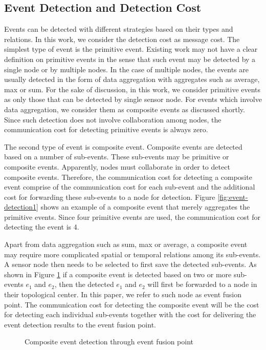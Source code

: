 \subsection{Event Detection and Detection Cost}
Events can be detected with different strategies based on their types and relations. In this work, we consider the detection cost as message cost. The simplest type of event is the primitive event. Existing work may not have a clear definition on primitive events in the sense that such event may be detected by a single node or by multiple nodes. In the case of multiple nodes, the events are usually detected in the form of data aggregation with aggregates such as average, max or sum. For the sake of discussion, in this work, we consider primitive events as only those that can be detected by single sensor node. For events which involve data aggregation, we consider them as composite events as discussed shortly. Since such detection does not involve collaboration among nodes, the communication cost for detecting primitive events is always zero. 

The second type of event is composite event. Composite events are detected based on a number of sub-events. These sub-events may be primitive or composite events. Apparently, nodes must collaborate in order to detect composite events. Therefore, the communication cost for detecting a composite event comprise of the communication cost for each sub-event and the additional cost for forwarding these sub-events to a node for detection. Figure \ref{fig:event-detection1} shows an example of a composite event that merely aggregates the primitive events. Since four primitive events are used, the communication cost for detecting the event is 4. 

Apart from data aggregation such as sum, max or average, a composite event may require more complicated spatial or temporal relations among its sub-events. A sensor node then needs to be selected to first save the detected sub-events. As shown in Figure \ref{fig:event-detection2} if a composite event is detected based on two or more sub-events \(e_1\) and \(e_2\), then the detected \(e_1\) and \(e_2\) will first be forwarded to a node in their topological center. In this paper, we refer to such node as event fusion point. The communication cost for detecting the composite event will be the cost for detecting each individual sub-events together with the cost for delivering the event detection results to the event fusion point.

\begin{figure}
\centering
{}
\caption{Composite event detection through event fusion point}
\label{fig:event-detection2}
\end{figure}

